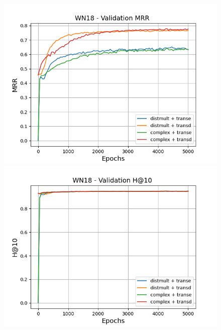 \begin{figure}
    \centering
    \begin{minipage}{.5\textwidth}
      \centering
      \includegraphics[width=\linewidth]{figures/results/gan_train/pretrained/random/wn18/gan_train_random_wn18_mrrs.png}
    \end{minipage}%
    \begin{minipage}{.5\textwidth}
      \centering
      \includegraphics[width=\linewidth]{figures/results/gan_train/pretrained/random/wn18/gan_train_random_wn18_hit10s.png}
    \end{minipage}
    

\end{figure}
